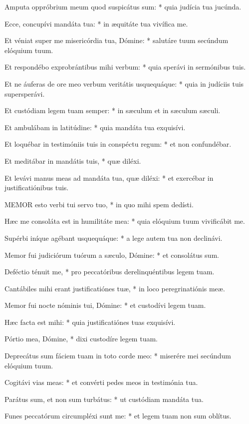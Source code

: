 Amputa oppróbrium meum quod suspicátus sum: * quia judícia tua jucúnda.

Ecce, concupívi mandáta tua: * in æquitáte tua vivífica me.

Et véniat super me misericórdia tua, Dómine: * salutáre tuum secúndum elóquium tuum.

Et respondébo exprobrántibus mihi verbum: * quia sperávi in sermónibus tuis.

Et ne áuferas de ore meo verbum veritátis usquequáque: * quia in judíciis tuis supersperávi.

Et custódiam legem tuam semper: * in sæculum et in sæculum sæculi.

Et ambulábam in latitúdine: * quia mandáta tua exquisívi.

Et loquébar in testimóniis tuis in conspéctu regum: * et non confundébar.

Et meditábar in mandátis tuis, * quæ diléxi.

Et levávi manus meas ad mandáta tua, quæ diléxi: * et exercébar in justificatiónibus tuis.


\lettrine[lines=2]{M}{EMOR} esto verbi tui servo tuo, * in quo mihi spem dedísti.

Hæc me consoláta est in humilitáte mea: * quia elóquium tuum vivificábit me.

Supérbi iníque agébant usquequáque: * a lege autem tua non declinávi.

Memor fui judiciórum tuórum a sæculo, Dómine: * et consolátus sum.

Deféctio ténuit me, * pro peccatóribus derelinquéntibus legem tuam.

Cantábiles mihi erant justificatiónes tuæ, * in loco peregrinatiónis meæ.

Memor fui nocte nóminis tui, Dómine: * et custodívi legem tuam.

Hæc facta est mihi: * quia justificatiónes tuas exquisívi.

Pórtio mea, Dómine, * dixi custodíre legem tuam.

Deprecátus sum fáciem tuam in toto corde meo: * miserére mei secúndum elóquium tuum.

Cogitávi vias meas: * et convérti pedes meos in testimónia tua.

Parátus sum, et non sum turbátus: * ut custódiam mandáta tua.

Funes peccatórum circumpléxi sunt me: * et legem tuam non sum oblítus.

